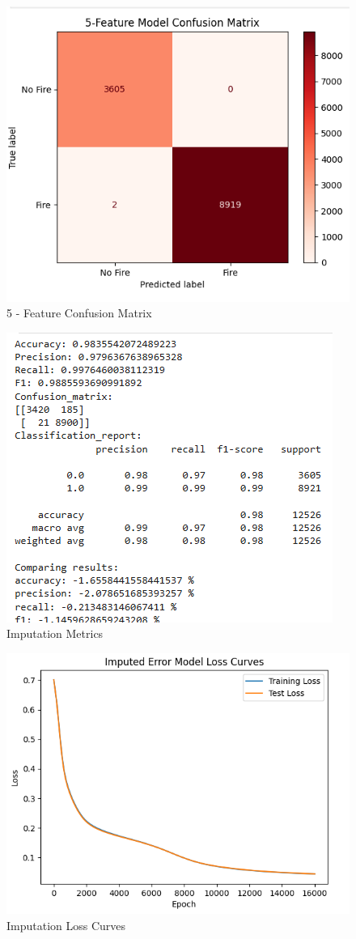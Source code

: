 \documentclass[conference]{IEEEtran}
\begin{document}
\begin{figure}[htbp]
    \centering
    \includegraphics[width=0.75\linewidth]{images/5CM.png}
    \caption{5 - Feature Confusion Matrix}
    \label{fig:5cm}
\end{figure}

\begin{figure}[htbp]
    \centering
    \includegraphics[width=0.75\linewidth]{images/imputationmetric.png}
    \caption{Imputation Metrics}
    \label{fig:errmet}
\end{figure}
\begin{figure}[htbp]
    \centering
    \includegraphics[width=0.75\linewidth]{images/ImputationLC.png}
    \caption{Imputation Loss Curves}
    \label{fig:errloss}
\end{figure}
\end{document}
